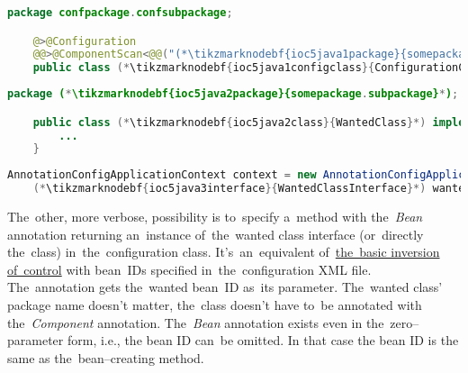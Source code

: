 \begin{lstlisting}[language=Java, title={Configuration class}]
    package confpackage.confsubpackage;

    @>@Configuration
    @@>@ComponentScan<@@("(*\tikzmarknodebf{ioc5java1package}{somepackage.subpackage}[ForestGreen]*)")
    public class (*\tikzmarknodebf{ioc5java1configclass}{ConfigurationClass}*) {}
\end{lstlisting}
\begin{lstlisting}[language=Java, title={Wanted class}]
    package (*\tikzmarknodebf{ioc5java2package}{somepackage.subpackage}*);

    public class (*\tikzmarknodebf{ioc5java2class}{WantedClass}*) implements (*\tikzmarknodebf{ioc5java2interface}{WantedClassInterface}*) {
        ...
    }
\end{lstlisting}
\begin{lstlisting}[language=Java, title={Usage}]
    AnnotationConfigApplicationContext context = new AnnotationConfigApplicationContext((*\tikzmarknodebf{ioc5java3configclass}{ConfigurationClass}*).class);
    (*\tikzmarknodebf{ioc5java3interface}{WantedClassInterface}*) wantedClassInstance = context.getBean("(*\tikzmarknodebf{ioc5java3beanid}{wantedClass}[ForestGreen]*)", (*\tikzmarknodebf{ioc5java3interface2}{WantedClassInterface}*).class);
\end{lstlisting}

\noindent The~other, more verbose, possibility is to~specify a~method with the~\textit{Bean} annotation returning an~instance of~the~wanted class interface (or~directly the~class) in~the~configuration class. It's~an~equivalent of~\hyperref[springinversionofcontrol]{the~basic inversion of~control} with bean~IDs specified in~the~configuration XML file. The~annotation gets the~wanted bean~ID as~its parameter. The~wanted class' package name doesn't matter, the~class doesn't have to~be annotated with the~\textit{Component} annotation. The~\textit{Bean} annotation exists even in the~zero--parameter form, i.e., the bean ID can~be omitted. In that case the bean ID is the same as the~bean--creating method.
\newpage

